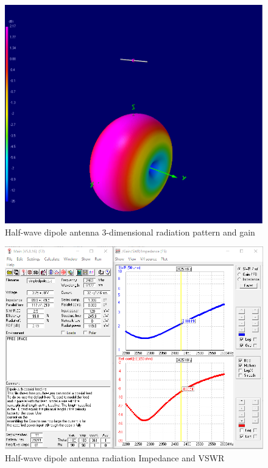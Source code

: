 \begin{figure}[h!]
\centering
\includegraphics[scale=0.52]{figures/SimulatedDipoleRad.PNG}
\caption{Half-wave dipole antenna 3-dimensional radiation pattern and gain}
\end{figure}

\begin{figure}[h!]
\centering
\includegraphics[scale=0.55]{figures/DipoleImpedanceVSWR.PNG}
\caption{Half-wave dipole antenna radiation Impedance and VSWR}
\end{figure}

